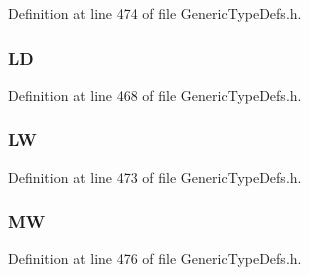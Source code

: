 Definition at line 474 of file Generic\+Type\+Defs.\+h.

\hypertarget{struct_q_w_o_r_d___v_a_l_1_1_____p_a_c_k_e_d_a420a032bb8b74ce6e42d17ae8614956c}{}
\subsubsection[{L\+D}]{ L\+D}\label{struct_q_w_o_r_d___v_a_l_1_1_____p_a_c_k_e_d_a420a032bb8b74ce6e42d17ae8614956c}


Definition at line 468 of file Generic\+Type\+Defs.\+h.

\hypertarget{struct_q_w_o_r_d___v_a_l_1_1_____p_a_c_k_e_d_a19457eba8e3d1d0a4882a78dd1c18fa1}{}
\subsubsection[{L\+W}]{ L\+W}\label{struct_q_w_o_r_d___v_a_l_1_1_____p_a_c_k_e_d_a19457eba8e3d1d0a4882a78dd1c18fa1}


Definition at line 473 of file Generic\+Type\+Defs.\+h.

\hypertarget{struct_q_w_o_r_d___v_a_l_1_1_____p_a_c_k_e_d_adca13508707068fcef191c92db9df686}{}
\subsubsection[{M\+W}]{ M\+W}\label{struct_q_w_o_r_d___v_a_l_1_1_____p_a_c_k_e_d_adca13508707068fcef191c92db9df686}


Definition at line 476 of file Generic\+Type\+Defs.\+h.

